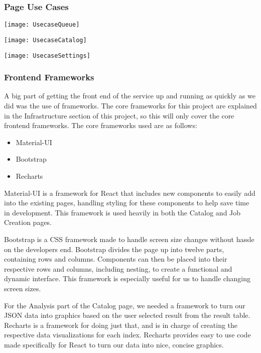 \subsubsection{Page Use Cases}
\begin{center}
  \texttt{[image: UsecaseQueue]} \\[12pt]
\end{center}
\begin{center}
  \texttt{[image: UsecaseCatalog]} \\[12pt]
\end{center}
\begin{center}
  \texttt{[image: UsecaseSettings]} \\[12pt]
\end{center}

\subsubsection{Frontend Frameworks}
A big part of getting the front end of the service up and running as quickly as we did was the use of frameworks. The core frameworks for this project are explained in the Infrastructure section of this project, so this will only cover the core frontend frameworks. The core frameworks used are as follows:
\begin{itemize}
  \item Material-UI
  \item Bootstrap
  \item Recharts
\end{itemize}
Material-UI is a framework for React that includes new components to easily add into the existing pages, handling styling for these components to help save time in development. This framework is used heavily in both the Catalog and Job Creation pages.\par
Bootstrap is a CSS framework made to handle screen size changes without hassle on the developer\textquotesingle s end. Bootstrap divides the page up into twelve parts, containing rows and columns. Components can then be placed into their respective rows and columns, including nesting, to create a functional and dynamic interface. This framework is especially useful for us to handle changing screen sizes.\par
For the Analysis part of the Catalog page, we needed a framework to turn our JSON data into graphics based on the user selected result from the result table. Recharts is a framework for doing just that, and is in charge of creating the respective data visualizations for each index. Recharts provides easy to use code made specifically for React to turn our data into nice, concise graphics.
